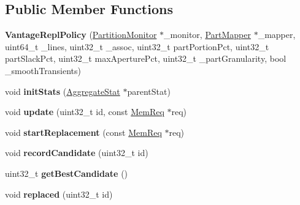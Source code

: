 \subsection*{Public Member Functions}
\begin{DoxyCompactItemize}
\item 
\hypertarget{classVantageReplPolicy_ab2458a07dbcda64cbcc4e01a04b6fd4a}{{\bfseries Vantage\-Repl\-Policy} (\hyperlink{classPartitionMonitor}{Partition\-Monitor} $\ast$\-\_\-monitor, \hyperlink{classPartMapper}{Part\-Mapper} $\ast$\-\_\-mapper, uint64\-\_\-t \-\_\-lines, uint32\-\_\-t \-\_\-assoc, uint32\-\_\-t part\-Portion\-Pct, uint32\-\_\-t part\-Slack\-Pct, uint32\-\_\-t max\-Aperture\-Pct, uint32\-\_\-t \-\_\-part\-Granularity, bool \-\_\-smooth\-Transients)}\label{classVantageReplPolicy_ab2458a07dbcda64cbcc4e01a04b6fd4a}

\item 
\hypertarget{classVantageReplPolicy_a4ef29a79720b88885374af04e23d237c}{void {\bfseries init\-Stats} (\hyperlink{classAggregateStat}{Aggregate\-Stat} $\ast$parent\-Stat)}\label{classVantageReplPolicy_a4ef29a79720b88885374af04e23d237c}

\item 
\hypertarget{classVantageReplPolicy_a281d05b9d69bb6acf223cf06e326ec35}{void {\bfseries update} (uint32\-\_\-t id, const \hyperlink{structMemReq}{Mem\-Req} $\ast$req)}\label{classVantageReplPolicy_a281d05b9d69bb6acf223cf06e326ec35}

\item 
\hypertarget{classVantageReplPolicy_ab5c16020ae5ad77478facd28c9c10d0e}{void {\bfseries start\-Replacement} (const \hyperlink{structMemReq}{Mem\-Req} $\ast$req)}\label{classVantageReplPolicy_ab5c16020ae5ad77478facd28c9c10d0e}

\item 
\hypertarget{classVantageReplPolicy_a0ca714989c8e4f7f1cb2d8ebcd37f6b8}{void {\bfseries record\-Candidate} (uint32\-\_\-t id)}\label{classVantageReplPolicy_a0ca714989c8e4f7f1cb2d8ebcd37f6b8}

\item 
\hypertarget{classVantageReplPolicy_abb51e687eba9ea5a7d05313b92a48dd1}{uint32\-\_\-t {\bfseries get\-Best\-Candidate} ()}\label{classVantageReplPolicy_abb51e687eba9ea5a7d05313b92a48dd1}

\item 
\hypertarget{classVantageReplPolicy_a40be15cb18b2145b7dae15b157b519c0}{void {\bfseries replaced} (uint32\-\_\-t id)}\label{classVantageReplPolicy_a40be15cb18b2145b7dae15b157b519c0}


\end{DoxyCompactItemize}
